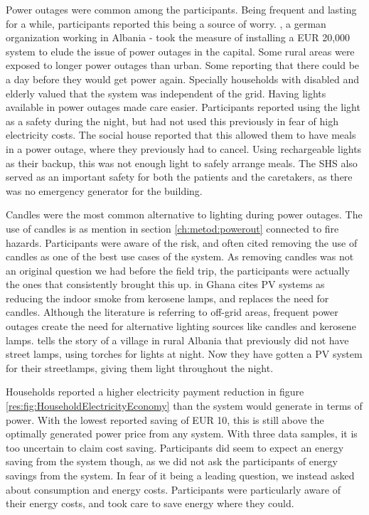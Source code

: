 Power outages were common among the participants. Being frequent and lasting for a while, participants reported this being a source of worry. \citep{giz_kfw_2013}, a german organization working in Albania - took the measure of installing a EUR 20,000 system to elude the issue of power outages in the capital. Some rural areas were exposed to longer power outages than urban. Some reporting that there could be a day before they would get power again. Specially households with disabled and elderly valued that the system was independent of the grid. Having lights available in power outages made care easier. Participants reported using the light as a safety during the night, but had not used this previously in fear of high electricity costs. The social house reported that this allowed them to have meals in a power outage, where they previously had to cancel. Using rechargeable lights as their backup, this was not enough light to safely arrange meals. The SHS also served as an important safety for both the patients and the caretakers, as there was no emergency generator for the building.

Candles were the most common alternative to lighting during power outages. The use of candles is as mention in section \ref{ch:metod:powerout} connected to fire hazards. Participants were aware of the risk, and often cited removing the use of candles as one of the best use cases of the system. As removing candles was not an original question we had before the field trip, the participants were actually the ones that consistently brought this up. \citep{obengSolarPhotovoltaicElectrification2008} in Ghana cites PV systems as reducing the indoor smoke from kerosene lamps, and replaces the need for candles. Although the literature is referring to off-grid areas, frequent power outages create the need for alternative lighting sources like candles and kerosene lamps. \citep{Sinoruka2023} tells the story of a village in rural Albania that previously did not have street lamps, using torches for lights at night. Now they have gotten a PV system for their streetlamps, giving them light throughout the night.

Households reported a higher electricity payment reduction in figure \ref{res:fig:HouseholdElectricityEconomy} than the system would generate in terms of power. With the lowest reported saving of EUR 10, this is still above the optimally generated power price from any system. With three data samples, it is too uncertain to claim cost saving. Participants did seem to expect an energy saving from the system though, as we did not ask the participants of energy savings from the system. In fear of it being a leading question, we instead asked about consumption and energy costs. Participants were particularly aware of their energy costs, and took care to save energy where they could. 


